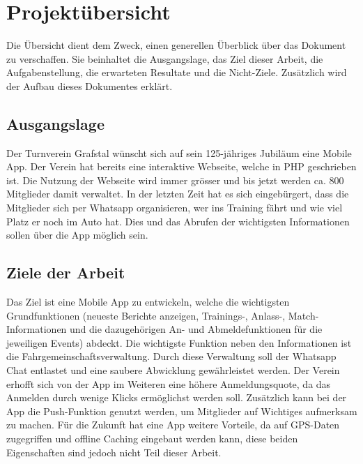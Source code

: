 %
%

\chapter{Projektübersicht}\label{chap.projektuebersicht}
Die Übersicht dient dem Zweck, einen generellen Überblick über das Dokument zu verschaffen. Sie beinhaltet die Ausgangslage, das Ziel dieser Arbeit, die Aufgabenstellung, die erwarteten Resultate und die Nicht-Ziele. Zusätzlich wird der Aufbau dieses Dokumentes erklärt.

\section{Ausgangslage}\label{ausganglage}
Der Turnverein Grafstal wünscht sich auf sein 125-jähriges Jubiläum eine Mobile App. Der Verein hat bereits eine interaktive Webseite, welche in PHP geschrieben ist. Die Nutzung der Webseite wird immer grösser und bis jetzt werden ca. 800 Mitglieder damit verwaltet. In der letzten Zeit hat es sich eingebürgert, dass die Mitglieder sich per Whatsapp organisieren, wer ins Training fährt und wie viel Platz er noch im Auto hat. Dies und das Abrufen der wichtigsten Informationen sollen über die App möglich sein.

\section{Ziele der Arbeit}\label{ziele}
Das Ziel ist eine Mobile App zu entwickeln, welche die wichtigsten Grundfunktionen (neueste Berichte anzeigen, Trainings-, Anlass-, Match-Informationen und die dazugehörigen An- und Abmeldefunktionen für die jeweiligen Events) abdeckt. Die wichtigste Funktion neben den Informationen ist die Fahrgemeinschaftsverwaltung. Durch diese Verwaltung soll der Whatsapp Chat entlastet und eine saubere Abwicklung gewährleistet werden. Der Verein erhofft sich von der App im Weiteren eine höhere Anmeldungsquote, da das Anmelden durch wenige Klicks ermöglichst werden soll. Zusätzlich kann bei der App die Push-Funktion genutzt werden, um Mitglieder auf Wichtiges aufmerksam zu machen. Für die Zukunft hat eine App weitere Vorteile, da auf GPS-Daten zugegriffen und offline Caching eingebaut werden kann, diese beiden Eigenschaften sind jedoch nicht Teil dieser Arbeit.

